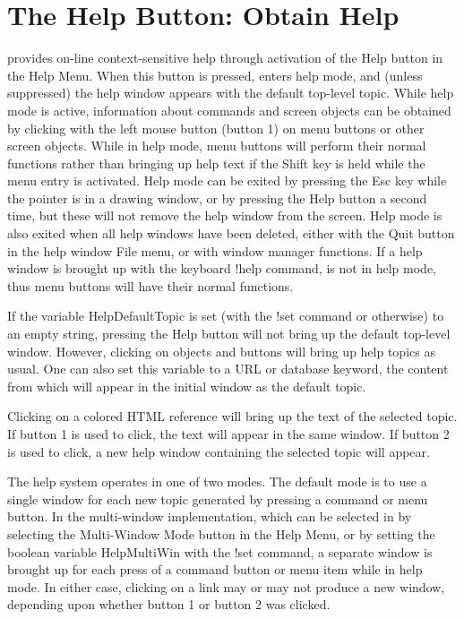 \section{The {\cb Help} Button: Obtain Help}
\label{helpsys}
{\Xic} provides on-line context-sensitive help through activation of
the {\cb Help} button in the {\cb Help Menu}.  When this button is
pressed, {\Xic} enters help mode, and (unless suppressed) the help
window appears with the default top-level topic.  While help mode is
active, information about commands and screen objects can be obtained
by clicking with the left mouse button (button 1) on menu buttons or
other screen objects.  While in help mode, menu buttons will perform
their normal functions rather than bringing up help text if the {\kb
Shift} key is held while the menu entry is activated.  Help mode can
be exited by pressing the {\kb Esc} key while the pointer is in a
drawing window, or by pressing the {\cb Help} button a second time,
but these will not remove the help window from the screen.  Help mode
is also exited when all help windows have been deleted, either with
the {\cb Quit} button in the help window {\cb File} menu, or with
window manager functions.  If a help window is brought up with the
keyboard {\cb !help} command, {\Xic} is not in help mode, thus menu
buttons will have their normal functions.

If the variable {\et HelpDefaultTopic} is set (with the {\cb !set}
command or otherwise) to an empty string, pressing the {\cb Help}
button will not bring up the default top-level window.  However,
clicking on objects and buttons will bring up help topics as usual. 
One can also set this variable to a URL or database keyword, the
content from which will appear in the initial window as the default
topic.

Clicking on a colored HTML reference will bring up the text of the
selected topic.  If button 1 is used to click, the text will appear in
the same window.  If button 2 is used to click, a new help window
containing the selected topic will appear.

The help system operates in one of two modes.  The default mode is to
use a single window for each new topic generated by pressing a command
or menu button.  In the multi-window implementation, which can be
selected in {\Xic} by selecting the {\cb Multi-Window Mode} button in
the {\cb Help Menu}, or by setting the boolean variable {\et
HelpMultiWin} with the {\cb !set} command, a separate window is
brought up for each press of a command button or menu item while in
help mode.  In either case, clicking on a link may or may not produce
a new window, depending upon whether button 1 or button 2 was clicked.

